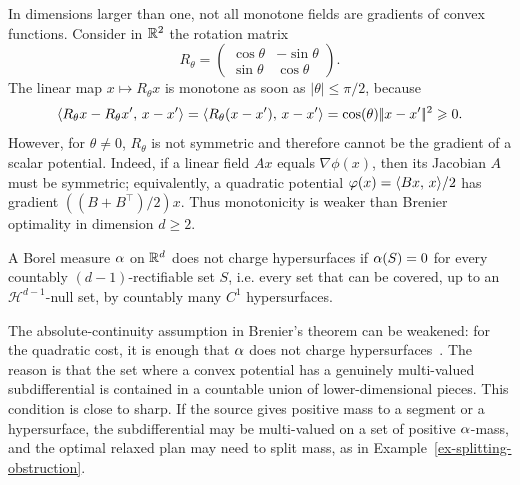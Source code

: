 \begin{rem}
	In dimensions larger than one, not all monotone fields are gradients of convex functions. Consider in $\mathbb{R}^2$ the rotation matrix
	\[
		R_\theta=\begin{pmatrix}
		\cos\theta & -\sin\theta\\
		\sin\theta & \cos\theta
		\end{pmatrix}.
	\]
	The linear map $x\mapsto R_\theta x$ is monotone as soon as $|\theta|\leq\pi/2$, because
	\[
		\langle R_\theta x-R_\theta x',\,x-x'\rangle
		=
		\langle R_\theta(x-x'),\,x-x'\rangle
		=
		\cos(\theta)|\!| x-x' |\!|^2\geqslant0.
	\]
	However, for $\theta\neq0$, $R_\theta$ is not symmetric and therefore cannot be the gradient of a scalar potential. Indeed, if a linear field $Ax$ equals $\nabla\phi(x)$, then its Jacobian $A$ must be symmetric; equivalently, a quadratic potential $\varphi(x)=\langle Bx,\,x\rangle/2$ has gradient $((B+B^\top)/2)x$. Thus monotonicity is weaker than Brenier optimality in dimension $d\geq2$.
\end{rem}

\begin{defn}\label{defn-not-charging-hypersurfaces}
	A Borel measure $\alpha$ on $\mathbb{R}^d$ does not charge hypersurfaces if $\alpha(S)=0$ for every countably $(d-1)$-rectifiable set $S$, i.e. every set that can be covered, up to an $\mathcal H^{d-1}$-null set, by countably many $C^1$ hypersurfaces.
\end{defn}

\begin{rem}
	The absolute-continuity assumption in Brenier's theorem can be weakened: for the quadratic cost, it is enough that $\alpha$ does not charge hypersurfaces~\cite{gangbo1996geometry,Villani09,SantambrogioBook}. The reason is that the set where a convex potential has a genuinely multi-valued subdifferential is contained in a countable union of lower-dimensional pieces. This condition is close to sharp. If the source gives positive mass to a segment or a hypersurface, the subdifferential may be multi-valued on a set of positive $\alpha$-mass, and the optimal relaxed plan may need to split mass, as in Example~\ref{ex-splitting-obstruction}.
\end{rem}

